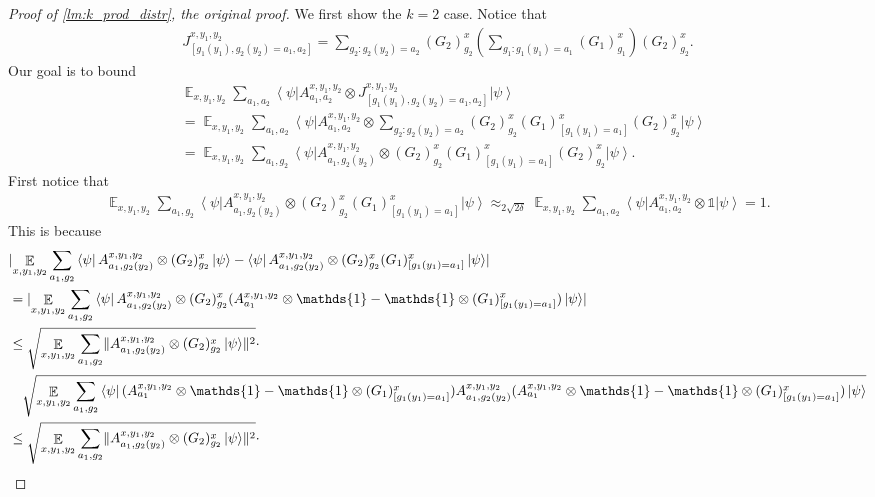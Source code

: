 \documentclass[11pt]{article}
\theoremstyle{plain}
\theoremstyle{definition}
\DeclarePairedDelimiter{\norm}{\lVert}{\rVert}
\DeclarePairedDelimiter{\abs}{\lvert}{\rvert}
\newcommand {\bra} [1] {\ensuremath{ \left\langle #1 \right| }}
\newcommand {\ket} [1] {\ensuremath{ \left| #1 \right\rangle }}
\DeclareMathOperator*{\bigE}{\mathbb{E}}
\newcommand {\id} {\ensuremath{\mathds{1}}}
\newcommand{\x}{\otimes}
\newcommand{\appd}[1]{\approx_{#1}}
\newcommand{\1}{\mathbb{1}} %
\begin{document}
\begin{proof}[Proof of \cref{lm:k_prod_distr}, the original proof]
	We first show the $k=2$ case. Notice that
	\begin{align*}
		J^{x,y_1,y_2}_{[g_1(y_1),g_2(y_2) = a_1, a_2]} = 
		\sum_{g_2: g_2(y_2)=a_2} (G_2)^x_{g_2} \left(\sum_{g_1: g_1(y_1) = a_1} (G_1)^x_{g_1}\right) (G_2)^x_{g_2}.
	\end{align*}
	Our goal is to bound
	\begin{align*}
		&\bigE_{x,y_1,y_2} \sum_{a_1, a_2} \bra{\psi} A^{x,y_1,y_2}_{a_1,a_2} \x J^{x,y_1,y_2}_{[g_1(y_1),g_2(y_2) = a_1, a_2]} \ket{\psi} \\
		&= \bigE_{x,y_1,y_2} \sum_{a_1, a_2} \bra{\psi} A^{x,y_1,y_2}_{a_1,a_2} \x 
		\sum_{g_2: g_2(y_2)=a_2} (G_2)^x_{g_2} (G_1)^x_{[g_1(y_1) = a_1]}(G_2)^x_{g_2} \ket{\psi} \\
		&=\bigE_{x,y_1,y_2} \sum_{a_1, g_2 }\bra{\psi} A^{x,y_1,y_2}_{a_1,g_2(y_2) } \x 
		 (G_2)^x_{g_2} (G_1)^x_{[g_1(y_1) = a_1]}(G_2)^x_{g_2} \ket{\psi}.
	\end{align*}
	First notice that 
	\begin{align*}
		\bigE_{x,y_1,y_2} \sum_{a_1, g_2 }\bra{\psi} A^{x,y_1,y_2}_{a_1 , g_2(y_2) } \x 
		 (G_2)^x_{g_2} (G_1)^x_{[g_1(y_1) = a_1]} \ket{\psi}
		 \appd{2\sqrt{2\delta}} 
		 \bigE_{x,y_1,y_2} \sum_{a_1, a_2} \bra{\psi} A^{x,y_1,y_2}_{a_1,a_2} \x \id \ket{\psi} = 1.
	\end{align*}
	This is because
	\begin{align*}
		&\abs{ \bigE_{x,y_1,y_2} \sum_{a_1, g_2 }\bra{\psi} A^{x,y_1,y_2}_{a_1, g_2(y_2) }  \x 
		 (G_2)^x_{g_2}  \ket{\psi} -
		  \bra{\psi} A^{x,y_1,y_2}_{a_1, g_2(y_2) } \x
		 (G_2)^x_{g_2} (G_1)^x_{[g_1(y_1) = a_1]} \ket{\psi}} \\
		& =  \abs{\bigE_{x,y_1,y_2}  \sum_{a_1, g_2} \bra{\psi} A^{x,y_1,y_2}_{a_1, g_2(y_2) } \x (G_2)^x_{g_2} 
		(A^{x,y_1,y_2}_{a_1} \x\id -\id\x(G_1)^x_{[g_1(y_1) = a_1]})\ket{\psi} }\\
		& \leq \sqrt{ \bigE_{x,y_1,y_2} \sum_{a_1, g_2} \norm{ A^{x,y_1,y_2}_{a_1, g_2(y_2) } \x (G_2)^x_{g_2} \ket{\psi}}^2} \cdot \\
		&\quad 
		\sqrt{\bigE_{x,y_1,y_2} \sum_{a_1, g_2} \bra{\psi} (A^{x,y_1,y_2}_{a_1} \x\id -\id\x(G_1)^x_{[g_1(y_1) = a_1]})  A^{x,y_1,y_2}_{a_1, g_2(y_2) }  (A^{x,y_1,y_2}_{a_1} \x\id -\id\x(G_1)^x_{[g_1(y_1) = a_1]})\ket{\psi}} \\
		& \leq \sqrt{ \bigE_{x,y_1,y_2} \sum_{a_1,g_2} \norm{ A^{x,y_1,y_2}_{a_1, g_2(y_2) } \x (G_2)^x_{g_2} \ket{\psi}}^2} \cdot \\

\end{align*}
\end{proof}
\end{document}
